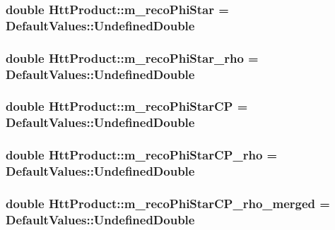 \label{classHttProduct_a14c6dc367cae8ab8dfec16d20180cd8d}
\hypertarget{classHttProduct_adce7e4fdde050504e61358f745be9c35}{
\subsubsection[{m\_\-recoPhiStar}]{\setlength{\rightskip}{0pt plus 5cm}double {\bf HttProduct::m\_\-recoPhiStar} = DefaultValues::UndefinedDouble}}
\label{classHttProduct_adce7e4fdde050504e61358f745be9c35}
\hypertarget{classHttProduct_a382e6a65e1bc7bac27069f8cfff2d234}{
\subsubsection[{m\_\-recoPhiStar\_\-rho}]{\setlength{\rightskip}{0pt plus 5cm}double {\bf HttProduct::m\_\-recoPhiStar\_\-rho} = DefaultValues::UndefinedDouble}}
\label{classHttProduct_a382e6a65e1bc7bac27069f8cfff2d234}
\hypertarget{classHttProduct_aa4bd2e24680c73548ed2fbc6b4ac7a19}{
\subsubsection[{m\_\-recoPhiStarCP}]{\setlength{\rightskip}{0pt plus 5cm}double {\bf HttProduct::m\_\-recoPhiStarCP} = DefaultValues::UndefinedDouble}}
\label{classHttProduct_aa4bd2e24680c73548ed2fbc6b4ac7a19}
\hypertarget{classHttProduct_a5aef45105c9b2e2069feeb411adf5904}{
\subsubsection[{m\_\-recoPhiStarCP\_\-rho}]{\setlength{\rightskip}{0pt plus 5cm}double {\bf HttProduct::m\_\-recoPhiStarCP\_\-rho} = DefaultValues::UndefinedDouble}}
\label{classHttProduct_a5aef45105c9b2e2069feeb411adf5904}
\hypertarget{classHttProduct_acbda6aa9798ef7cb8c3cefb04cf81bce}{
\subsubsection[{m\_\-recoPhiStarCP\_\-rho\_\-merged}]{\setlength{\rightskip}{0pt plus 5cm}double {\bf HttProduct::m\_\-recoPhiStarCP\_\-rho\_\-merged} = DefaultValues::UndefinedDouble}}
